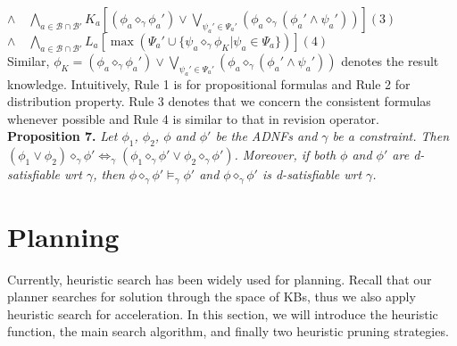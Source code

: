 \documentclass{llncs}
\begin{document}
{\hspace*{0.1in}\hspace{0.75in} $\land \quad
   \bigwedge_{a\in\mathcal{B}\cap\mathcal{B}'}K_a[(\phi_a\diamond_\gamma\phi_a')
   \lor\bigvee_{\psi_a'\in\Psi_a'}(\phi_a\diamond_\gamma(\phi_a'\land\psi_a'))]$\hspace{0.43in}$(3)$\\
\hspace*{0.1in}\hspace{0.75in} $\land \quad \bigwedge_{a\in\mathcal{B}\cap\mathcal{B}'}L_a[
   \max{(\Psi_a'\cup\{\psi_a\diamond_\gamma\phi_K|\psi_a\in\Psi_a\})}]$\hspace{0.81in}$(4)$}\vspace{0.05in}\\
Similar, $\phi_K=(\phi_a\diamond_\gamma\phi_a')\lor\bigvee_{\psi_a'\in\Psi_a'}(\phi_a\diamond_\gamma(\phi_a'\land\psi_a'))$ denotes the result knowledge. Intuitively, Rule 1 is for propositional formulas and Rule 2 for distribution property. Rule 3 denotes that we concern the consistent formulas whenever possible and Rule 4 is similar to that in revision operator. \\
\textbf{Proposition 7.} \textit{Let $\phi_1$, $\phi_2$, $\phi$ and $\phi'$ be the ADNFs and $\gamma$ be a constraint. Then $(\phi_1\lor\phi_2)\diamond_\gamma\phi'\Leftrightarrow_\gamma(\phi_1\diamond_\gamma\phi'\lor\phi_2\diamond_\gamma\phi')$. Moreover, if both $\phi$ and $\phi'$ are d-satisfiable wrt $\gamma$, then $\phi\diamond_\gamma\phi'\models_\gamma\phi'$ and $\phi\diamond_\gamma\phi'$ is d-satisfiable wrt $\gamma$.}

\section{Planning}
Currently, heuristic search has been widely used for planning. Recall that our planner searches for solution through the space of KBs, thus we also apply heuristic search for acceleration. In this section, we will introduce the heuristic function, the main search algorithm, and finally two heuristic pruning strategies.
\end{document}
